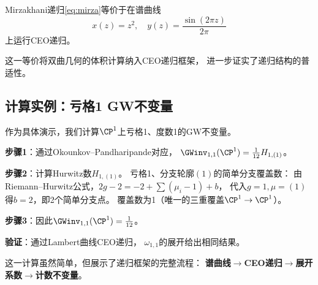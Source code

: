 \begin{theorem}\label{thm:mirzaEO}
Mirzakhani递归\eqref{eq:mirza}等价于在谱曲线
\[
x(z) = z^2, \quad y(z) = \frac{\sin(2\pi z)}{2\pi}
\]
上运行CEO递归。
\end{theorem}

这一等价将双曲几何的体积计算纳入CEO递归框架，
进一步证实了递归结构的普适性。

\subsection{计算实例：亏格1 GW不变量}

作为具体演示，我们计算$\CP^1$上亏格1、度数1的GW不变量。

\begin{example}\label{ex:gw11}
\textbf{步骤1}：通过Okounkov--Pandharipande对应，
$\GWinv_{1, 1}(\CP^1) = \frac{1}{12} H_{1, (1)}$。

\textbf{步骤2}：计算Hurwitz数$H_{1, (1)}$。
亏格1、分支轮廓$(1)$的简单分支覆盖数：
由Riemann--Hurwitz公式，$2g-2 = -2 + \sum (\mu_i - 1) + b$，
代入$g=1, \mu=(1)$得$b = 2$，即2个简单分支点。
覆盖数为1（唯一的三重覆盖$\CP^1 \to \CP^1$）。

\textbf{步骤3}：因此$\GWinv_{1, 1}(\CP^1) = \frac{1}{12}$。

\textbf{验证}：通过Lambert曲线CEO递归，
$\omega_{1,1}$的展开给出相同结果。
\end{example}

这一计算虽然简单，但展示了递归框架的完整流程：
\textbf{谱曲线$\to$CEO递归$\to$展开系数$\to$计数不变量}。
